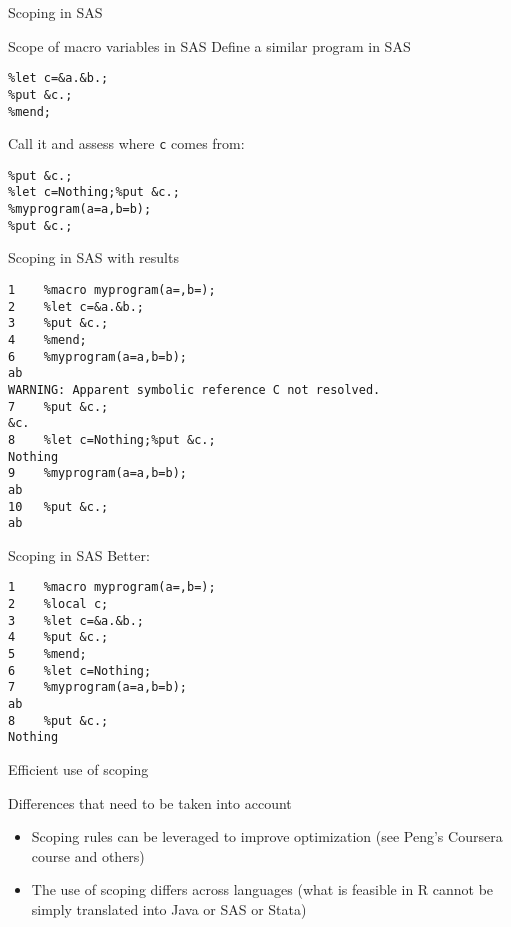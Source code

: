 \documentclass[xcolor=table,compress]{beamer}
\begin{document}
\begin{frame}[fragile]{Scoping in SAS}
\begin{block}{Scope of macro variables in SAS}
Define a similar program in SAS
\begin{lstlisting}[language=SAS,numbers=none]
%macro myprogram(a=,b=);
%let c=&a.&b.;
%put &c.;
%mend;
\end{lstlisting}
\pause Call it and assess where \texttt{c} comes from:
\begin{lstlisting}[language=SAS,numbers=none]
%myprogram(a=a,b=b);
%put &c.;
%let c=Nothing;%put &c.;
%myprogram(a=a,b=b);
%put &c.;
\end{lstlisting}
\end{block}
\end{frame}


\begin{frame}[fragile]{Scoping in SAS}
with results
\begin{lstlisting}[language=SAS,numbers=none]
1    %macro myprogram(a=,b=);
2    %let c=&a.&b.;
3    %put &c.;
4    %mend;
6    %myprogram(a=a,b=b);
ab
WARNING: Apparent symbolic reference C not resolved.
7    %put &c.;
&c.
8    %let c=Nothing;%put &c.;
Nothing
9    %myprogram(a=a,b=b);
ab
10   %put &c.;
ab
\end{lstlisting}

\end{frame}



\begin{frame}[fragile]{Scoping in SAS}
Better:
\begin{lstlisting}[language=SAS,numbers=none]
1    %macro myprogram(a=,b=);
2    %local c;
3    %let c=&a.&b.;
4    %put &c.;
5    %mend;
6    %let c=Nothing;
7    %myprogram(a=a,b=b);
ab
8    %put &c.;
Nothing
\end{lstlisting}
\end{frame}


\begin{frame}{Efficient use of scoping}
\begin{block}{Differences that need to be taken into account}
\begin{itemize}
\item Scoping rules can be leveraged to improve optimization (see Peng's Coursera course and others)
\item The use of scoping differs across languages (what is feasible in R cannot be simply translated into Java or SAS or Stata)
\end{itemize}
\end{block}
\end{frame}
\end{document}
